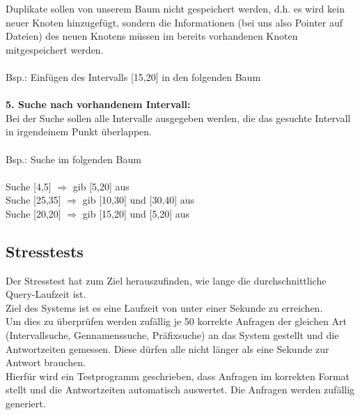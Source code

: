 Duplikate sollen von unserem Baum nicht gespeichert werden, d.h. es wird kein neuer Knoten hinzugefügt, sondern die Informationen (bei uns also Pointer auf Dateien) des neuen Knotens müssen im bereits vorhandenen Knoten mitgespeichert werden.\\\\
Bsp.: Einfügen des Intervalls [15,20] in den folgenden Baum\\\\
\textbf{5. Suche nach vorhandenem Intervall:}\\
Bei der Suche sollen alle Intervalle ausgegeben werden, die das gesuchte Intervall in irgendeinem Punkt überlappen.\\\\
Bsp.: Suche im folgenden Baum\\\\
Suche [4,5] $\Rightarrow$ gib [5,20] aus\\
Suche [25,35] $\Rightarrow$ gib [10,30] und [30,40] aus\\
Suche [20,20] $\Rightarrow$ gib [15,20] und [5,20] aus
\subsection{Stresstests}
Der Stresstest hat zum Ziel herauszufinden, wie lange die durchschnittliche Query-Laufzeit ist.\\
Ziel des Systems ist es eine Laufzeit von unter einer Sekunde zu erreichen.\\
Um dies zu überprüfen werden zufällig je 50 korrekte Anfragen der gleichen Art (Intervallsuche, Gennamenssuche, Präfixsuche) an das System gestellt und die Antwortzeiten gemessen. Diese dürfen alle nicht länger als eine Sekunde zur Antwort brauchen.\\
Hierfür wird ein Testprogramm geschrieben, dass Anfragen im korrekten Format stellt und die Antwortzeiten automatisch auswertet. Die Anfragen werden zufällig generiert.

